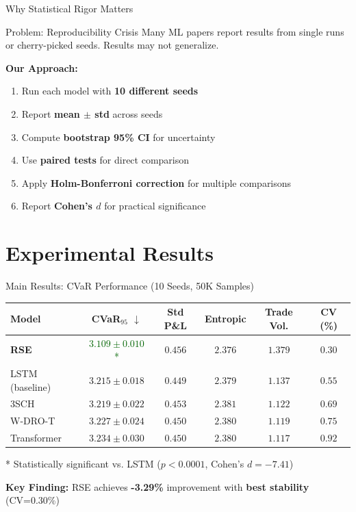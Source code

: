 \documentclass[aspectratio=169,11pt]{beamer}
\begin{document}
\begin{frame}{Why Statistical Rigor Matters}
\begin{alertblock}{Problem: Reproducibility Crisis}
Many ML papers report results from single runs or cherry-picked seeds. Results may not generalize.
\end{alertblock}

\vspace{0.3cm}
\textbf{Our Approach:}
\begin{enumerate}
    \item Run each model with \textbf{10 different seeds}
    \item Report \textbf{mean $\pm$ std} across seeds
    \item Compute \textbf{bootstrap 95\% CI} for uncertainty
    \item Use \textbf{paired tests} for direct comparison
    \item Apply \textbf{Holm-Bonferroni correction} for multiple comparisons
    \item Report \textbf{Cohen's $d$} for practical significance
\end{enumerate}
\end{frame}

\section{Experimental Results}

\begin{frame}{Main Results: CVaR Performance (10 Seeds, 50K Samples)}
\begin{table}
\centering
\small
\begin{tabular}{lccccc}
\toprule
\textbf{Model} & \textbf{CVaR$_{95}$} $\downarrow$ & \textbf{Std P\&L} & \textbf{Entropic} & \textbf{Trade Vol.} & \textbf{CV (\%)} \\
\midrule
\textbf{RSE} & \textcolor{darkgreen}{$\mathbf{3.109 \pm 0.010}$*} & $0.456$ & $2.376$ & $1.379$ & $\mathbf{0.30}$ \\
LSTM (baseline) & $3.215 \pm 0.018$ & $0.449$ & $2.379$ & $1.137$ & $0.55$ \\
3SCH & $3.219 \pm 0.022$ & $0.453$ & $2.381$ & $1.122$ & $0.69$ \\
W-DRO-T & $3.227 \pm 0.024$ & $0.450$ & $2.380$ & $1.119$ & $0.75$ \\
Transformer & $3.234 \pm 0.030$ & $0.450$ & $2.380$ & $1.117$ & $0.92$ \\
\bottomrule
\end{tabular}
\end{table}

\vspace{0.2cm}
\small{* Statistically significant vs. LSTM ($p < 0.0001$, Cohen's $d = -7.41$)}

\vspace{0.2cm}
\textbf{Key Finding:} RSE achieves \textbf{-3.29\%} improvement with \textbf{best stability} (CV=0.30\%)
\end{frame}
\end{document}
